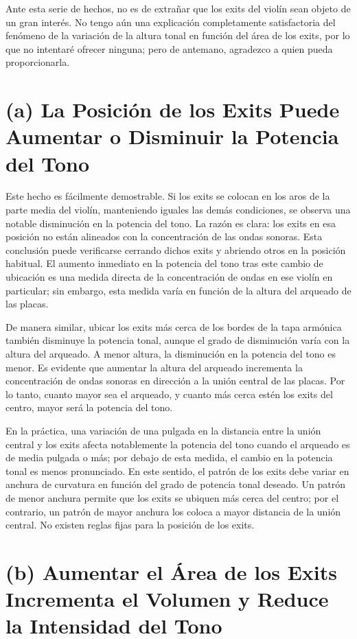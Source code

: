 \documentclass[12pt]{book}
\begin{document}
Ante esta serie de hechos, no es de extrañar que los exits del violín sean objeto de un gran interés. No tengo aún una explicación completamente satisfactoria del fenómeno de la variación de la altura tonal en función del área de los exits, por lo que no intentaré ofrecer ninguna; pero de antemano, agradezco a quien pueda proporcionarla.

\section*{(a) La Posición de los Exits Puede Aumentar o Disminuir la Potencia del Tono}

Este hecho es fácilmente demostrable. Si los exits se colocan en los aros de la parte media del violín, manteniendo iguales las demás condiciones, se observa una notable disminución en la potencia del tono. La razón es clara: los exits en esa posición no están alineados con la concentración de las ondas sonoras. Esta conclusión puede verificarse cerrando dichos exits y abriendo otros en la posición habitual. El aumento inmediato en la potencia del tono tras este cambio de ubicación es una medida directa de la concentración de ondas en ese violín en particular; sin embargo, esta medida varía en función de la altura del arqueado de las placas.

De manera similar, ubicar los exits más cerca de los bordes de la tapa armónica también disminuye la potencia tonal, aunque el grado de disminución varía con la altura del arqueado. A menor altura, la disminución en la potencia del tono es menor. Es evidente que aumentar la altura del arqueado incrementa la concentración de ondas sonoras en dirección a la unión central de las placas. Por lo tanto, cuanto mayor sea el arqueado, y cuanto más cerca estén los exits del centro, mayor será la potencia del tono.

En la práctica, una variación de una pulgada en la distancia entre la unión central y los exits afecta notablemente la potencia del tono cuando el arqueado es de media pulgada o más; por debajo de esta medida, el cambio en la potencia tonal es menos pronunciado. En este sentido, el patrón de los exits debe variar en anchura de curvatura en función del grado de potencia tonal deseado. Un patrón de menor anchura permite que los exits se ubiquen más cerca del centro; por el contrario, un patrón de mayor anchura los coloca a mayor distancia de la unión central. No existen reglas fijas para la posición de los exits.

\section*{(b) Aumentar el Área de los Exits Incrementa el Volumen y Reduce la Intensidad del Tono}
\end{document}
